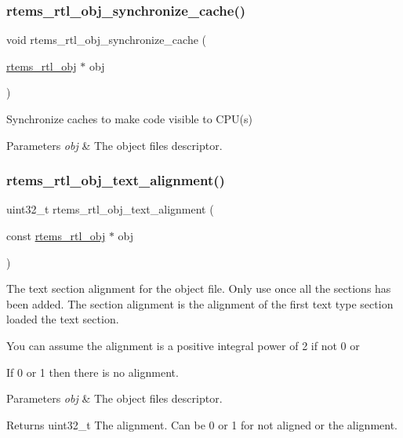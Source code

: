 \subsubsection{\texorpdfstring{rtems\_rtl\_obj\_synchronize\_cache()}{rtems\_rtl\_obj\_synchronize\_cache()}}
{\footnotesize\ttfamily void rtems\+\_\+rtl\+\_\+obj\+\_\+synchronize\+\_\+cache (\begin{DoxyParamCaption}\item[{\mbox{\hyperlink{structrtems__rtl__obj}{rtems\+\_\+rtl\+\_\+obj}} $\ast$}]{obj }\end{DoxyParamCaption})}

Synchronize caches to make code visible to C\+P\+U(s)


\begin{DoxyParams}{Parameters}
{\em obj} & The object file\textquotesingle{}s descriptor. \\
\hline
\end{DoxyParams}
\mbox{\label{rtl-obj_8h_a21f97e47f7caa7bb88f685f2b5b7d18b}} 
\subsubsection{\texorpdfstring{rtems\_rtl\_obj\_text\_alignment()}{rtems\_rtl\_obj\_text\_alignment()}}
{\footnotesize\ttfamily uint32\+\_\+t rtems\+\_\+rtl\+\_\+obj\+\_\+text\+\_\+alignment (\begin{DoxyParamCaption}\item[{const \mbox{\hyperlink{structrtems__rtl__obj}{rtems\+\_\+rtl\+\_\+obj}} $\ast$}]{obj }\end{DoxyParamCaption})}

The text section alignment for the object file. Only use once all the sections has been added. The section alignment is the alignment of the first text type section loaded the text section.

You can assume the alignment is a positive integral power of 2 if not 0 or
\begin{DoxyEnumerate}
\item If 0 or 1 then there is no alignment.
\end{DoxyEnumerate}


\begin{DoxyParams}{Parameters}
{\em obj} & The object file\textquotesingle{}s descriptor. \\
\hline
\end{DoxyParams}
\begin{DoxyReturn}{Returns}
uint32\+\_\+t The alignment. Can be 0 or 1 for not aligned or the alignment. 
\end{DoxyReturn}
\mbox{\label{rtl-obj_8h_a4df3f868b6e5b13ec7e326028683e87a}} 
